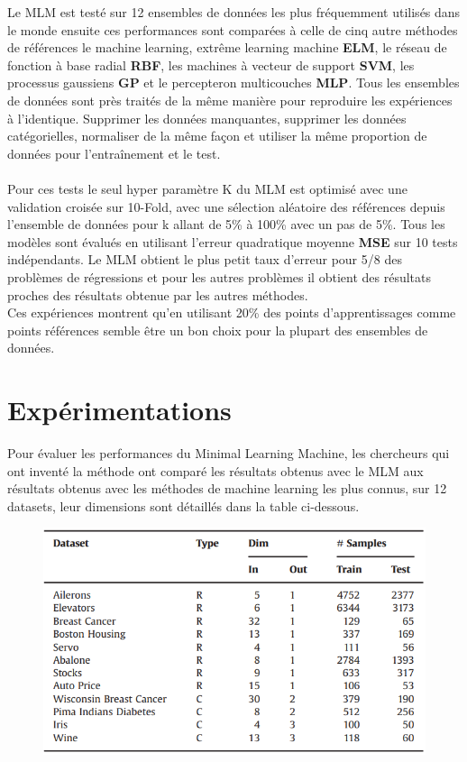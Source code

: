\documentclass[12pt,a4paper]{report}
\begin{document}
\par Le MLM est testé sur 12 ensembles de données les plus fréquemment utilisés dans le monde ensuite ces performances sont comparées à celle de cinq autre méthodes de références le machine learning, extrême learning machine \textbf{ELM}, le réseau de fonction à base radial \textbf{RBF}, les machines à vecteur de support \textbf{SVM}, les processus gaussiens \textbf{GP} et le percepteron multicouches \textbf{MLP}. Tous les ensembles de données sont près traités de la même manière pour reproduire les expériences à l'identique. Supprimer les données manquantes, supprimer les données catégorielles, normaliser de la même façon et utiliser la même proportion de données pour l'entraînement et le test. \\ \\
Pour ces tests le seul hyper paramètre K du MLM est optimisé avec une validation croisée sur 10-Fold, avec une sélection aléatoire des références depuis l'ensemble de données pour k allant de 5\% à 100\% avec un pas de 5\%. Tous les modèles sont évalués en utilisant l'erreur quadratique moyenne \textbf{MSE} sur 10 tests indépendants. Le MLM obtient le plus petit taux d'erreur pour 5/8 des problèmes de régressions et pour les autres problèmes il obtient des résultats proches des résultats obtenue par les autres méthodes.\\
Ces expériences montrent qu'en utilisant 20\% des points d'apprentissages comme points références semble être un bon choix pour la plupart des ensembles de données.

{\color{MidnightBlue}\chapter{Expérimentations}}
\par Pour évaluer les performances du Minimal Learning Machine, les chercheurs qui ont inventé la méthode ont comparé les résultats obtenus avec le MLM aux résultats obtenus avec les méthodes de machine learning les plus connus, sur 12 datasets, leur dimensions sont détaillés dans la table ci-dessous.
\begin{figure}[hbt!]
\centering
\includegraphics[scale=0.99]{data.png}
\end{figure}
\end{document}
